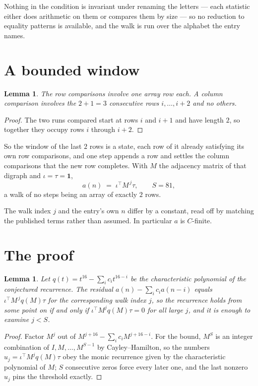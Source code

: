 \documentclass[11pt,a4paper]{article}
\theoremstyle{plain}
\newtheorem{lemma}[theorem]{Lemma}
\theoremstyle{definition}
\begin{document}
Nothing in the condition is invariant under renaming the letters --- each statistic either does
arithmetic on them or compares them by size --- so no reduction to equality patterns is
available, and the walk is run over the alphabet the entry names.

\section{A bounded window}

\begin{lemma}\label{lem:win}
The row comparisons involve one array row each. A column comparison involves the
$2+1=3$ consecutive rows $i,\dots,i{+}2$ and no others.
\end{lemma}

\begin{proof}
The two runs compared start at rows $i$ and $i+1$ and have length $2$, so together they
occupy rows $i$ through $i+2$.
\end{proof}

So the window of the last $2$ rows is a state, each row of it already satisfying its own row
comparisons, and one step appends a row and settles the column comparisons that the new row
completes. With $M$ the adjacency matrix of that digraph and $\iota=\tau=\mathbf{1}$,
\[
a(n)\;=\;\iota^{\!\top}M^{\,j}\tau ,\qquad S=81,
\]
a walk of no steps being an array of exactly $2$ rows.

The walk index $j$ and the entry's own $n$ differ by a constant, read off by matching the
published terms rather than assumed. In particular $a$ is $C$-finite.

\section{The proof}

\begin{lemma}\label{lem:crit}
Let $q(t)=t^{16}-\sum_i c_it^{16-i}$ be the characteristic polynomial of the
conjectured recurrence. The residual $a(n)-\sum_ic_ia(n-i)$ equals
$\iota^{\!\top}M^{\,j}q(M)\tau$ for the corresponding walk index $j$, so the recurrence
holds from some point on if and only if $\iota^{\!\top}M^{j}q(M)\tau=0$ for all large $j$,
and it is enough to examine $j<S$.
\end{lemma}

\begin{proof}
Factor $M^{j}$ out of $M^{j+16}-\sum_ic_iM^{j+16-i}$. For the bound, $M^{S}$
is an integer combination of $I,M,\dots,M^{S-1}$ by Cayley--Hamilton, so the numbers
$u_j=\iota^{\!\top}M^{j}q(M)\tau$ obey the monic recurrence given by the characteristic
polynomial of $M$; $S$ consecutive zeros force every later one, and the last nonzero $u_j$
pins the threshold exactly.
\end{proof}
\end{document}
